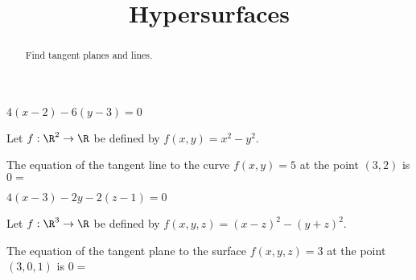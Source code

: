 \documentclass{ximera}
\title{Hypersurfaces}
\begin{document}
	\begin{abstract}
		Find tangent planes and lines.
	\end{abstract}
	
	\begin{question}
		\begin{hint}
			$4(x-2)-6(y-3) = 0$
		\end{hint}
		Let $f:\R^2 \to \R$ be defined by $f(x,y)=x^2-y^2$.
		\begin{question}
			The equation of the tangent line to the curve $f(x,y)=5$ at the point $(3,2)$ 
			is $0=$ 
		\end{question}
	\end{question}
	
	\begin{question}
		\begin{hint}
			$4(x-3)-2y-2(z-1) = 0$
		\end{hint}
		Let $f:\R^3 \to \R$ be defined by $f(x,y,z)=(x-z)^2-(y+z)^2$.
		\begin{question}
			The equation of the tangent plane to the surface $f(x,y,z)=3$ at the point $(3,0,1)$ 
			is $0=$ \answer{$4(x-3)-2y-2(z-1)$}
		\end{question}
	\end{question}

	
\end{document}
